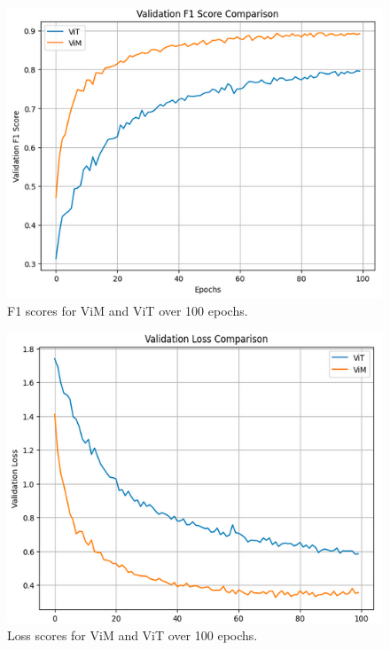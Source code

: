 \documentclass[conference]{IEEEtran}
\begin{document}
\begin{figure}[!t]
    \centering
    \includegraphics[width=\columnwidth]{imgs/f1_comparison.png}
    \caption{F1 scores for ViM and ViT over 100 epochs.}
    \label{fig:ViMViTF1}
\end{figure}
\begin{figure}[!t]
    \centering
    \includegraphics[width=\columnwidth]{imgs/loss_comparison.png}
    \caption{Loss scores for ViM and ViT over 100 epochs.}
    \label{fig:ViMViTLoss}
\end{figure}
\end{document}
